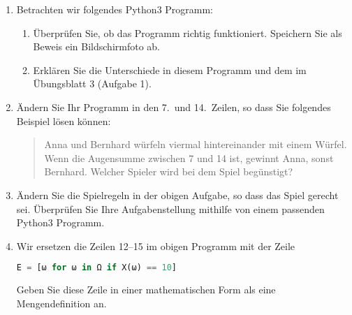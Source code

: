 \documentclass{article}
\begin{document}
\begin{enumerate}
\item Betrachten wir folgendes Python3 Programm:


\begin{enumerate}
\item Überprüfen Sie, ob das Programm richtig funktioniert. Speichern Sie als Beweis ein Bildschirmfoto ab.
\item Erklären Sie die Unterschiede in diesem Programm und dem im Übungsblatt 3 (Aufgabe 1).
\end{enumerate}

\item Ändern Sie Ihr Programm in den 7.~und 14.~Zeilen, so dass Sie folgendes Beispiel lösen können:
\begin{quote}
Anna und Bernhard würfeln viermal hintereinander mit einem Würfel. 
Wenn die Augensumme zwischen 7 und 14 ist, gewinnt Anna, sonst Bernhard.
Welcher Spieler wird bei dem Spiel begünstigt?
\end{quote}

\item Ändern Sie die Spielregeln in der obigen Aufgabe, so dass das Spiel gerecht sei.
Überprüfen Sie Ihre Aufgabenstellung mithilfe von einem passenden Python3 Programm.

\item Wir ersetzen die Zeilen 12--15 im obigen Programm mit der Zeile
\begin{lstlisting}[language=Python,numbers=none]
E = [ω for ω in Ω if X(ω) == 10]
\end{lstlisting}
Geben Sie diese Zeile in einer mathematischen Form als eine Mengendefinition an.

\end{enumerate}
\end{document}
